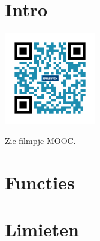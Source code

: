 
\section*{Intro}

\begin{minipage}{.25\linewidth}
	\raggedright
	\includegraphics[width=4cm]{2_elem_rekenvaardigheden_B/inputs/QR_Code_INTRO_module2}
\end{minipage}
\begin{minipage}{.7\linewidth}
	Zie filmpje MOOC.
\end{minipage}

\section{Functies}



\section{Limieten}


